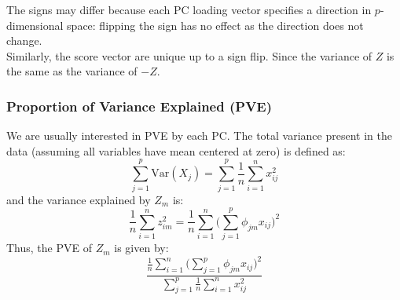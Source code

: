 \documentclass[11pt]{article}
\begin{document}
\noindent The signs may differ because each PC loading vector specifies a direction in $p$-dimensional space: flipping the sign has no effect as the direction does not change. \\

\noindent Similarly, the score vector are unique up to a sign flip. Since the variance of $Z$ is the same as the variance of $-Z$.

\subsubsection*{Proportion of Variance Explained (PVE)}
\noindent We are usually interested in PVE by each PC. The total variance present in the data (assuming all variables have mean centered at zero) is defined as:
$$\sum_{j=1}^p{\text{Var}(X_j)} = \sum_{j=1}^{p}{\frac{1}{n}\sum_{i=1}^{n}{x_{ij}^2}}$$
\noindent and the variance explained by $Z_m$ is:
$$\frac{1}{n}\sum_{i=1}^{n}{z_{im}^{2}} = \frac{1}{n}\sum_{i=1}^{n}\Big(\sum_{j=1}^{p}{\phi_{jm}x_{ij}} \Big)^2$$
\noindent Thus, the PVE of $Z_m$ is given by:
$$\frac{\frac{1}{n}\sum_{i=1}^{n}\Big( \sum_{j=1}^{p}{\phi_{jm}x_{ij}} \Big)^2}{\sum_{j=1}^{p}\frac{1}{n}\sum_{i=1}^{n}x_{ij}^2}$$
\end{document}
